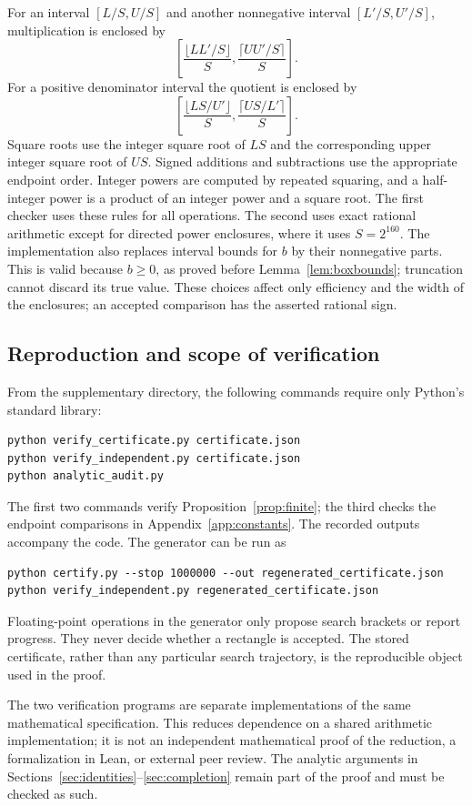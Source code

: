 \documentclass[11pt,letterpaper,reqno]{amsart}
\theoremstyle{definition}
\numberwithin{equation}{section}
\begin{document}
For an interval $[L/S,U/S]$ and another nonnegative interval $[L'/S,U'/S]$, multiplication is enclosed by
\[
 \left[\frac{\lfloor LL'/S\rfloor}{S},
       \frac{\lceil UU'/S\rceil}{S}\right].
\]
For a positive denominator interval the quotient is enclosed by
\[
 \left[\frac{\lfloor LS/U'\rfloor}{S},
       \frac{\lceil US/L'\rceil}{S}\right].
\]
Square roots use the integer square root of $LS$ and the corresponding upper integer square root of $US$. Signed additions and subtractions use the appropriate endpoint order. Integer powers are computed by repeated squaring, and a half-integer power is a product of an integer power and a square root. The first checker uses these rules for all operations. The second uses exact rational arithmetic except for directed power enclosures, where it uses $S=2^{160}$. The implementation also replaces interval bounds for $b$ by their nonnegative parts. This is valid because $b\ge0$, as proved before Lemma~\ref{lem:boxbounds}; truncation cannot discard its true value. These choices affect only efficiency and the width of the enclosures; an accepted comparison has the asserted rational sign.

\subsection{Reproduction and scope of verification}\label{app:reproduce}
From the supplementary directory, the following commands require only Python's standard library:
\begin{verbatim}
python verify_certificate.py certificate.json
python verify_independent.py certificate.json
python analytic_audit.py
\end{verbatim}
The first two commands verify Proposition~\ref{prop:finite}; the third checks the endpoint comparisons in Appendix~\ref{app:constants}. The recorded outputs accompany the code. The generator can be run as
\begin{verbatim}
python certify.py --stop 1000000 --out regenerated_certificate.json
python verify_independent.py regenerated_certificate.json
\end{verbatim}
Floating-point operations in the generator only propose search brackets or report progress. They never decide whether a rectangle is accepted. The stored certificate, rather than any particular search trajectory, is the reproducible object used in the proof.

The two verification programs are separate implementations of the same mathematical specification. This reduces dependence on a shared arithmetic implementation; it is not an independent mathematical proof of the reduction, a formalization in Lean, or external peer review. The analytic arguments in Sections~\ref{sec:identities}--\ref{sec:completion} remain part of the proof and must be checked as such.
\end{document}
